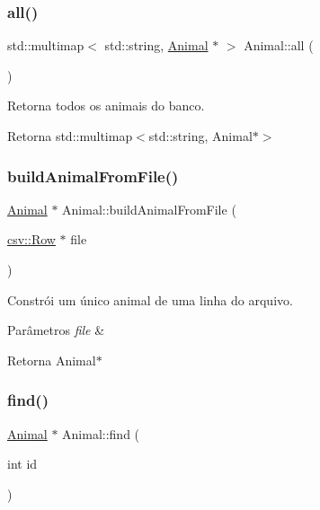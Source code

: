 \subsubsection{\texorpdfstring{all()}{all()}}
{\footnotesize\ttfamily std\+::multimap$<$ std\+::string, \hyperlink{classAnimal}{Animal} $\ast$ $>$ Animal\+::all (\begin{DoxyParamCaption}{ }\end{DoxyParamCaption})\hspace{0.3cm}{\ttfamily [static]}}



Retorna todos os animais do banco. 

\begin{DoxyReturn}{Retorna}
std\+::multimap$<$std\+::string, Animal$\ast$$>$ 
\end{DoxyReturn}
\mbox{\label{classAnimal_a8b0e3217c72fa8de0316828c6385dd99}} 
\subsubsection{\texorpdfstring{build\+Animal\+From\+File()}{buildAnimalFromFile()}}
{\footnotesize\ttfamily \hyperlink{classAnimal}{Animal} $\ast$ Animal\+::build\+Animal\+From\+File (\begin{DoxyParamCaption}\item[{\hyperlink{classcsv_1_1Row}{csv\+::\+Row} $\ast$}]{file }\end{DoxyParamCaption})\hspace{0.3cm}{\ttfamily [static]}}



Constrói um único animal de uma linha do arquivo. 


\begin{DoxyParams}{Parâmetros}
{\em file} & \\
\hline
\end{DoxyParams}
\begin{DoxyReturn}{Retorna}
Animal$\ast$ 
\end{DoxyReturn}
\mbox{\label{classAnimal_aac52a938d9c55280467c9f6e9564df95}} 
\subsubsection{\texorpdfstring{find()}{find()}}
{\footnotesize\ttfamily \hyperlink{classAnimal}{Animal} $\ast$ Animal\+::find (\begin{DoxyParamCaption}\item[{int}]{id }\end{DoxyParamCaption})\hspace{0.3cm}{\ttfamily [static]}}



